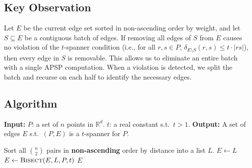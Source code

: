 \documentclass{article}
\begin{document}
\subsection{Key Observation}

Let $E$ be the current edge set sorted in non-ascending order by weight, and let $S \subseteq E$ be a contiguous batch of edges. If removing all edges of $S$ from $E$ causes no violation of the $t$-spanner condition (i.e., for all $r, s \in P$, $\delta_{E \setminus S}(r,s) \le t \cdot |rs|$), then every edge in $S$ is removable. This allows us to eliminate an entire batch with a single APSP computation. When a violation is detected, we split the batch and recurse on each half to identify the necessary edges.

\subsection{Algorithm}

\begin{algorithm}
\caption{Descending Greedy Filter with Binary Search}
\begin{algorithmic}[1]
\Statex \textbf{Input:}
\Statex \hspace{1cm} $P$: a set of $n$ points in $\mathbb{R}^d$.
\Statex \hspace{1cm} $t$: a real constant s.t.\ $t > 1$.
\Statex \textbf{Output:}
\Statex \hspace{1cm} A set of edges $E$ s.t.\ $(P, E)$ is a $t$-spanner for $P$.

\State Sort all $\binom{n}{2}$ pairs in \textbf{non-ascending} order by distance into a list $L$.
\State $E \leftarrow L$
\State $E \leftarrow \textsc{Bisect}(E, L, P, t)$
\State \Return $E$
\end{algorithmic}
\end{algorithm}
\end{document}
